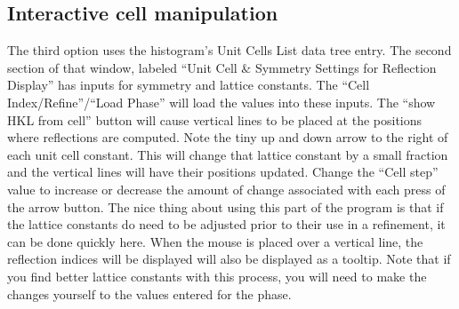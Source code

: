 \subsection{Interactive cell manipulation}
The third option uses the histogram's Unit Cells List data tree entry. The second section of that window, labeled ``Unit Cell \& Symmetry Settings for Reflection Display'' has inputs for symmetry and lattice constants. The ``Cell Index/Refine''/``Load Phase'' will load the values into these inputs. The ``show HKL from cell'' button will cause vertical lines to be placed at the positions where reflections are computed. Note the tiny up and down arrow to the right of each unit cell constant. This will change that lattice constant by a small fraction and the vertical lines will have their positions updated. Change the ``Cell step'' value to increase or decrease the amount of change associated with each press of the arrow button. The nice thing about using this part of the program is that if the lattice constants do need to be adjusted prior to their use in a refinement, it can be done quickly here. When the mouse is placed over a vertical line, the reflection indices will be displayed will also be displayed as a tooltip. Note that if you find better lattice constants with this process, you will need to make the changes yourself to the values entered for the phase. 

